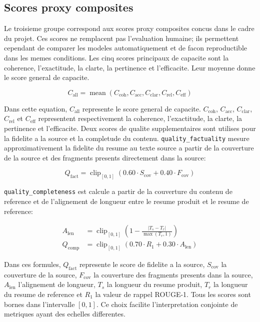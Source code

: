 \subsection{Scores proxy composites}

Le troisieme groupe correspond aux scores proxy composites concus dans le cadre du projet. Ces scores ne remplacent pas l'evaluation humaine; ils permettent cependant de comparer les modeles automatiquement et de facon reproductible dans les memes conditions. Les cinq scores principaux de capacite sont la coherence, l'exactitude, la clarte, la pertinence et l'efficacite. Leur moyenne donne le score general de capacite.

\begin{equation}
C_{\mathrm{all}}
= \operatorname{mean}(C_{\mathrm{coh}}, C_{\mathrm{acc}}, C_{\mathrm{clar}}, C_{\mathrm{rel}}, C_{\mathrm{eff}})
\label{eq:capability-overall-fr}
\end{equation}

Dans cette equation, $C_{\mathrm{all}}$ represente le score general de capacite. $C_{\mathrm{coh}}$, $C_{\mathrm{acc}}$, $C_{\mathrm{clar}}$, $C_{\mathrm{rel}}$ et $C_{\mathrm{eff}}$ representent respectivement la coherence, l'exactitude, la clarte, la pertinence et l'efficacite. Deux scores de qualite supplementaires sont utilises pour la fidelite a la source et la completude du contenu. \texttt{quality\_factuality} mesure approximativement la fidelite du resume au texte source a partir de la couverture de la source et des fragments presents directement dans la source:

\begin{equation}
Q_{\mathrm{fact}}
= \operatorname{clip}_{[0,1]}(0.60 \cdot S_{\mathrm{cov}}
+ 0.40 \cdot F_{\mathrm{cov}})
\label{eq:quality-factuality-fr}
\end{equation}

\texttt{quality\_completeness} est calcule a partir de la couverture du contenu de reference et de l'alignement de longueur entre le resume produit et le resume de reference:

\begin{align}
A_{\mathrm{len}}
&= \operatorname{clip}_{[0,1]}\left(1 - \frac{|T_s - T_r|}{\max(T_r, 1)}\right) \\
Q_{\mathrm{comp}}
&= \operatorname{clip}_{[0,1]}(0.70 \cdot R_1 + 0.30 \cdot A_{\mathrm{len}})
\label{eq:quality-completeness-fr}
\end{align}

Dans ces formules, $Q_{\mathrm{fact}}$ represente le score de fidelite a la source, $S_{\mathrm{cov}}$ la couverture de la source, $F_{\mathrm{cov}}$ la couverture des fragments presents dans la source, $A_{\mathrm{len}}$ l'alignement de longueur, $T_s$ la longueur du resume produit, $T_r$ la longueur du resume de reference et $R_1$ la valeur de rappel ROUGE-1. Tous les scores sont bornes dans l'intervalle $[0,1]$. Ce choix facilite l'interpretation conjointe de metriques ayant des echelles differentes.

